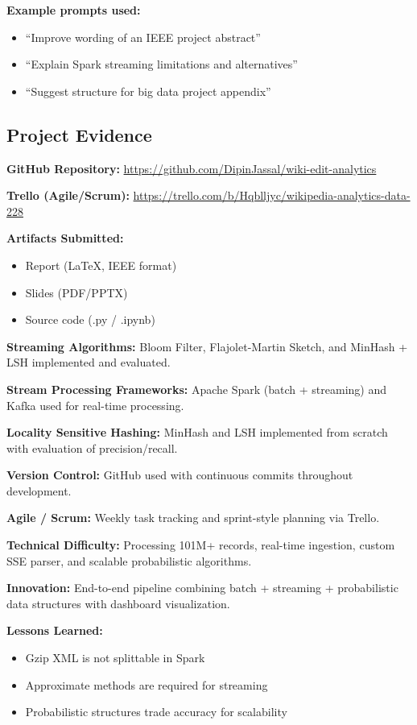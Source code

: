 \documentclass[conference]{IEEEtran}
\begin{document}
\textbf{Example prompts used:}
\begin{itemize}
    \item ``Improve wording of an IEEE project abstract''
    \item ``Explain Spark streaming limitations and alternatives''
    \item ``Suggest structure for big data project appendix''
\end{itemize}

\subsection*{Project Evidence}

\textbf{GitHub Repository:}  
\url{https://github.com/DipinJassal/wiki-edit-analytics}

\textbf{Trello (Agile/Scrum):}  
\url{https://trello.com/b/Hqblljyc/wikipedia-analytics-data-228}

\textbf{Artifacts Submitted:}
\begin{itemize}
    \item Report (LaTeX, IEEE format)
    \item Slides (PDF/PPTX)
    \item Source code (.py / .ipynb)
\end{itemize}

\textbf{Streaming Algorithms:}  
Bloom Filter, Flajolet-Martin Sketch, and MinHash + LSH implemented and evaluated.

\textbf{Stream Processing Frameworks:}  
Apache Spark (batch + streaming) and Kafka used for real-time processing.

\textbf{Locality Sensitive Hashing:}  
MinHash and LSH implemented from scratch with evaluation of precision/recall.

\textbf{Version Control:}  
GitHub used with continuous commits throughout development.

\textbf{Agile / Scrum:}  
Weekly task tracking and sprint-style planning via Trello.

\textbf{Technical Difficulty:}  
Processing 101M+ records, real-time ingestion, custom SSE parser, and scalable probabilistic algorithms.

\textbf{Innovation:}  
End-to-end pipeline combining batch + streaming + probabilistic data structures with dashboard visualization.

\textbf{Lessons Learned:}
\begin{itemize}
    \item Gzip XML is not splittable in Spark
    \item Approximate methods are required for streaming
    \item Probabilistic structures trade accuracy for scalability
\end{itemize}
\end{document}

